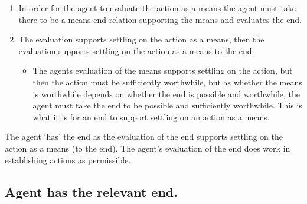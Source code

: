 \documentclass[10pt]{article}
\newcommand{\hozlinedash}[0]{%
  \noindent\hdashrule[0.5ex][c]{\textwidth}{.1pt}{2.5pt}
}
\begin{document}
\begin{enumerate}[label=\alph*, ref=(\alph*)]
\item In order for the agent to evaluate the action as a means the agent must take there to be a means-end relation supporting the means and evaluates the end.
\item The evaluation supports settling on the action as a means, then the evaluation supports settling on the action as a means to the end.
  \begin{itemize}
  \item The agents evaluation of the means supports settling on the action, but then the action must be sufficiently worthwhile, but as whether the means is worthwhile depends on whether the end is possible and worthwhile, the agent must take the end to be possible and sufficiently worthwhile.
    This is what it is for an end to support settling on an action as a means.
  \end{itemize}
\end{enumerate}


The agent `has' the end as the evaluation of the end supports settling on the action as a means (to the end).
The agent's evaluation of the end does work in establishing actions as permissible.

\newpage


\subsection{Agent has the relevant end.}
\label{sec:posessed-end}

\hozlinedash
\end{document}
